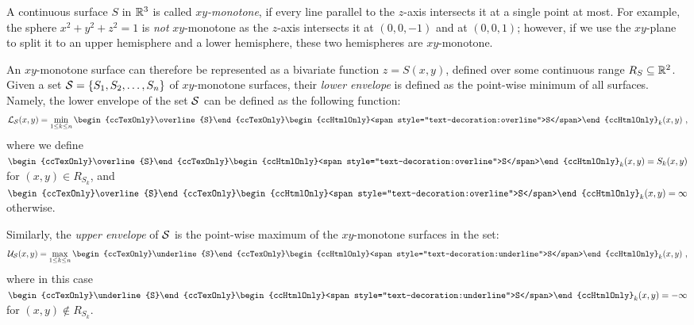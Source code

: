 
A continuous surface $S$ in $\mathbb{R}^3$ is called {\em $xy$-monotone},
if every line parallel to the $z$-axis intersects it at a single point
at most. For example, the sphere $x^2 + y^2 + z^2 = 1$ is {\em not}
$xy$-monotone as the $z$-axis intersects it at $(0, 0, -1)$ and at
$(0, 0, 1)$; however, if we use the $xy$-plane to split it to an
upper hemisphere and a lower hemisphere, these two hemispheres are
$xy$-monotone.

An $xy$-monotone surface can therefore be represented as a
bivariate function $z = S(x,y)$, defined over some continuous range
$R_S \subseteq \mathbb{R}^2$. Given a set ${\cal S} = \{ S_1, S_2, \ldots,
S_n \}$ of $xy$-monotone surfaces, their {\em lower envelope} is defined
as the point-wise minimum of all surfaces. Namely, the lower envelope
of the set ${\cal S}$ can be defined as the following function:
\begin{eqnarray*}
\calL_{\calS} (x,y) = \min_{1 \leq k \leq n}{
\begin{ccTexOnly}\overline{S}\end{ccTexOnly}
\begin{ccHtmlOnly}<span style="text-decoration:overline">S</span>\end{ccHtmlOnly}
_k (x,y)} \ ,
\end{eqnarray*}
where we define $
\begin{ccTexOnly}\overline{S}\end{ccTexOnly}
\begin{ccHtmlOnly}<span style="text-decoration:overline">S</span>\end{ccHtmlOnly}
_k(x,y) = S_k(x,y)$ for $(x,y) \in R_{S_k}$, and $
\begin{ccTexOnly}\overline{S}\end{ccTexOnly}
\begin{ccHtmlOnly}<span style="text-decoration:overline">S</span>\end{ccHtmlOnly}
_k(x,y) = \infty$ otherwise.

Similarly, the {\em upper envelope} of ${\cal S}$ is the point-wise maximum of
the $xy$-monotone surfaces in the set:
\begin{eqnarray*}
\calU_{\calS} (x,y) = \max_{1 \leq k \leq n}{
\begin{ccTexOnly}\underline{S}\end{ccTexOnly}
\begin{ccHtmlOnly}<span style="text-decoration:underline">S</span>\end{ccHtmlOnly}
_k (x,y)} \ ,
\end{eqnarray*}
where in this case $
\begin{ccTexOnly}\underline{S}\end{ccTexOnly}
\begin{ccHtmlOnly}<span style="text-decoration:underline">S</span>\end{ccHtmlOnly}
_k(x,y) = -\infty$ for $(x,y) \not\in
R_{S_k}$.

